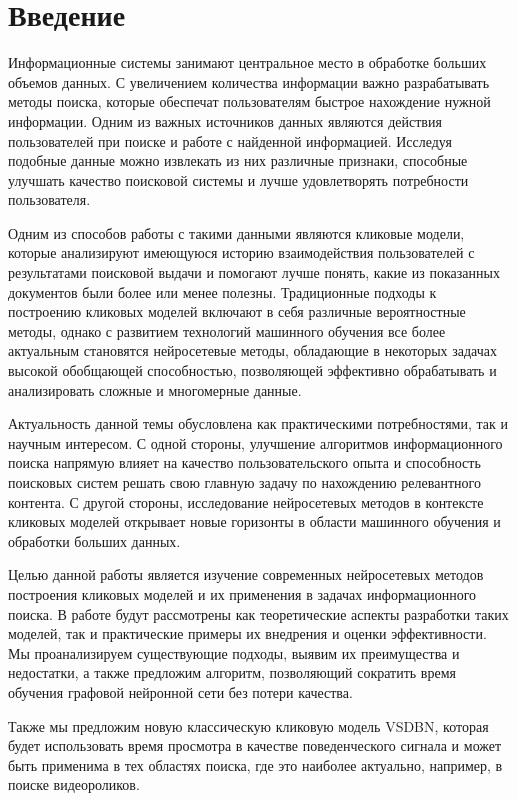 \documentclass[diploma]{nanolab2015}
\begin{document}

\setcounter{page}{3}
\clearpage
\tableofcontents{}  %
\clearpage
\chapter{Введение}
Информационные системы занимают центральное место в обработке больших объемов данных. С увеличением количества информации важно разрабатывать методы поиска, которые обеспечат пользователям быстрое нахождение нужной информации. Одним из важных источников данных являются действия пользователей при поиске и работе с найденной информацией. Исследуя подобные данные можно извлекать из них различные признаки, способные улучшать качество поисковой системы и лучше удовлетворять потребности пользователя.

Одним из способов работы с такими данными являются кликовые модели, которые анализируют имеющуюся историю взаимодействия пользователей с результатами поисковой выдачи и помогают лучше понять, какие из показанных документов были более или менее полезны. Традиционные подходы к построению кликовых моделей включают в себя различные вероятностные методы, однако с развитием технологий машинного обучения все более актуальным становятся нейросетевые методы, обладающие в некоторых задачах высокой обобщающей способностью, позволяющей эффективно обрабатывать и анализировать сложные и многомерные данные.

Актуальность данной темы обусловлена как практическими потребностями, так и научным интересом. С одной стороны, улучшение алгоритмов информационного поиска напрямую влияет на качество пользовательского опыта и способность поисковых систем решать свою главную задачу по нахождению релевантного контента. С другой стороны, исследование нейросетевых методов в контексте кликовых моделей открывает новые горизонты в области машинного обучения и обработки больших данных.

Целью данной работы является изучение современных нейросетевых методов построения кликовых моделей и их применения в задачах информационного поиска. В работе будут рассмотрены как теоретические аспекты разработки таких моделей, так и практические примеры их внедрения и оценки эффективности. Мы проанализируем существующие подходы, выявим их преимущества и недостатки, а также предложим алгоритм, позволяющий сократить время обучения графовой нейронной сети без потери качества.

Также мы предложим новую классическую кликовую модель VSDBN, которая будет использовать время просмотра в качестве поведенческого сигнала и может быть применима в тех областях поиска, где это наиболее актуально, например, в поиске видеороликов.
\newpage
\end{document}
